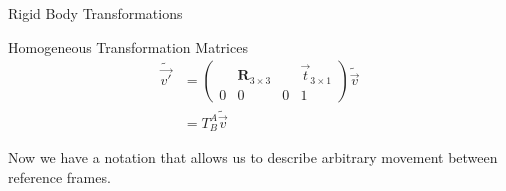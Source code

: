 \documentclass[presentation, aspectratio=1610]{beamer}
\begin{document}
\begin{frame}[label={sec:org28a67bf}]{Rigid Body Transformations}
\begin{block}{Homogeneous Transformation Matrices}
\begin{equation*}
  \begin{aligned}
  \tilde{\vec{v'}} &=
  \begin{pmatrix}
    & \mathbf{R}_{3 \times 3} & & \vec{t}_{3 \times 1} \\
    0 & 0 & 0 & 1
  \end{pmatrix}\tilde{\vec{v}} \\
    &= T^{A}_{B} \tilde{\vec{v}}
  \end{aligned}
\end{equation*}

Now we have a notation that allows us to describe arbitrary movement between reference frames.
\end{block}
\end{frame}
\end{document}
